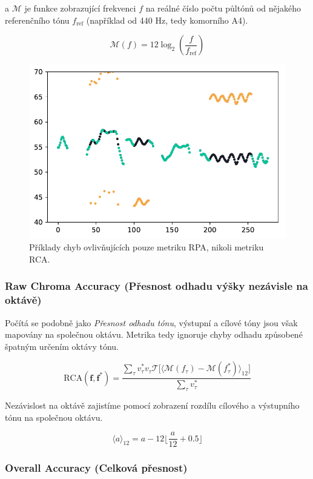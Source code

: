 a $\mathcal{M}$ je funkce zobrazující frekvenci $f$ na reálné číslo počtu půltónů od nějakého referenčního tónu $f_{\mathrm{ref}}$ (například od 440 Hz, tedy komorního A4).

    $$\mathcal{M}(f) = 12 \log_2(\frac{f}{f_{\mathrm{ref}}})$$


\begin{figure}[h!]\centering
\includegraphics[scale=0.5]{../img/chyba_RCA}
\caption{Příklady chyb  ovlivňujících pouze metriku RPA, nikoli metriku RCA.}
\label{obr:chyba_RPA}
\end{figure}

\subsubsection{Raw Chroma Accuracy (Přesnost odhadu výšky nezávisle na oktávě)}

Počítá se podobně jako \textit{Přesnost odhadu tónu}, výstupní a cílové tóny jsou však mapovány na společnou oktávu. Metrika tedy ignoruje chyby odhadu způsobené špatným určením oktávy tónu.

    $$\mathrm{RCA}(\mathbf{f}, \mathbf{f^*}) = \frac{\sum_\tau{v^*_\tau v_\tau \mathcal{T}[\langle \mathcal{M}(f_\tau) - \mathcal{M}(f^*_\tau)} \rangle_{12}] }{\sum_\tau{v^*_\tau}}$$

Nezávislost na oktávě zajistíme pomocí zobrazení rozdílu cílového a výstupního tónu na společnou oktávu.

    $$\langle a \rangle_{12} = a - 12 \lfloor \frac{a}{12} + 0.5 \rfloor  $$


\subsubsection{Overall Accuracy (Celková přesnost)}

